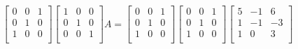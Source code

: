 \documentclass{article}
\begin{document}
      $$
      \begin{bmatrix}
        0 & 0 & 1 \\
        0 & 1 & 0 \\
        1 & 0 & 0 \\
    \end{bmatrix}
      \begin{bmatrix}
          1 & 0 & 0 \\
          0 & 1 & 0 \\
          0 & 0 & 1 \\
      \end{bmatrix}
      A = 
      \begin{bmatrix}
        0 & 0 & 1 \\
        0 & 1 & 0 \\
        1 & 0 & 0 \\
    \end{bmatrix}
      \begin{bmatrix}
        0 & 0 & 1 \\
        0 & 1 & 0 \\
        1 & 0 & 0 \\
    \end{bmatrix}
      \begin{bmatrix}
        5  & -1 & 6 \\
          1 & -1 & -3 \\
          1  & 0 & 3 \\
      \end{bmatrix}
        $$
\end{document}
